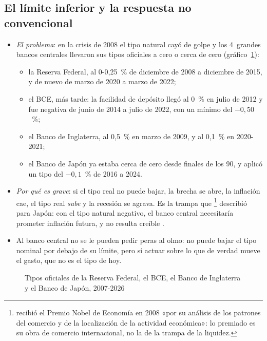 \documentclass[11pt]{article}
\begin{document}
\subsection{El límite inferior y la respuesta no convencional}\label{sec:limite-inferior}

\begin{itemize}
\item \emph{El problema}: en la crisis de 2008 el tipo natural cayó de golpe y los 4~grandes bancos centrales llevaron sus tipos oficiales a cero o cerca de cero (gráfico~\ref{fig:tipos-oficiales}):
  \begin{itemize}
  \item la Reserva Federal, al 0-0,25~\% de diciembre de 2008 a diciembre de 2015, y de nuevo de marzo de 2020 a marzo de 2022\nocite{FedNY2026EFFR};
  \item el BCE, más tarde: la facilidad de depósito llegó al 0~\% en julio de 2012 y fue negativa de junio de 2014 a julio de 2022, con un mínimo del $-0{,}50$~\%\nocite{BCE2026Tipos};
  \item el Banco de Inglaterra, al 0,5~\% en marzo de 2009, y al 0,1~\% en 2020-2021\nocite{BoE2026BankRate};
  \item el Banco de Japón ya estaba cerca de cero desde finales de los 90, y aplicó un tipo del $-0{,}1$~\% de 2016 a 2024\nocite{BoJ2016Negativo,BoJ2024Marco}.
  \end{itemize}
\item \emph{Por qué es grave}: si el tipo real no puede bajar, la brecha se abre, la inflación cae, el tipo real \emph{sube} y la recesión se agrava. Es la trampa que \textcite{Krugman1998Baaack}\footnote{ recibió el Premio Nobel de Economía en 2008 «por su análisis de los patrones del comercio y de la localización de la actividad económica»\nocite{Nobel2008Krugman}: lo premiado es su obra de comercio internacional, no la de la trampa de la liquidez.} describió para Japón: con el tipo natural negativo, el banco central necesitaría prometer inflación futura, y no resulta creíble  .
\item Al banco central no se le pueden pedir peras al olmo: no puede bajar el tipo nominal por debajo de su límite, pero sí actuar sobre lo que de verdad mueve el gasto, que no es el tipo de hoy.
\end{itemize}

\begin{figure}[H]
\centering
\caption{Tipos oficiales de la Reserva Federal, el BCE, el Banco de Inglaterra y el Banco de Japón, 2007-2026}\label{fig:tipos-oficiales}
\end{figure}
\end{document}
